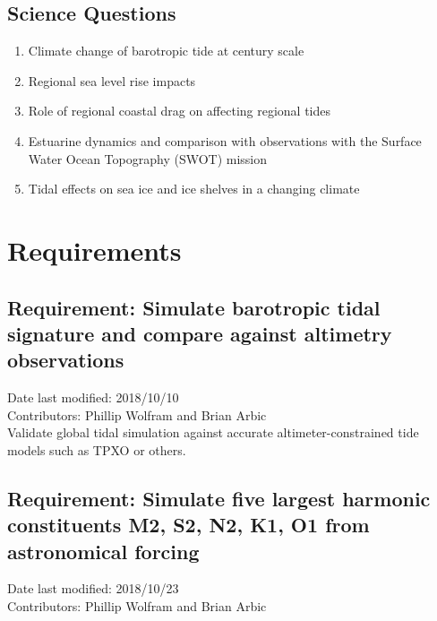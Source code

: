 
\section{Science Questions}
\begin{enumerate}
    \item Climate change of barotropic tide at century scale
    \item Regional sea level rise impacts
    \item Role of regional coastal drag on affecting regional tides
    \item Estuarine dynamics and comparison with observations with the Surface Water Ocean Topography (SWOT) mission
    \item Tidal effects on sea ice and ice shelves in a changing climate
    
\end{enumerate}



\chapter{Requirements}

\section{Requirement: Simulate barotropic tidal signature and compare against altimetry observations}
Date last modified: 2018/10/10 \\
Contributors: Phillip Wolfram and Brian Arbic\\

Validate global tidal simulation against accurate altimeter-constrained tide models such as TPXO or others.

\section{Requirement: Simulate five largest harmonic constituents M2, S2, N2, K1, O1 from astronomical forcing}
Date last modified: 2018/10/23 \\
Contributors: Phillip Wolfram and Brian Arbic\\

